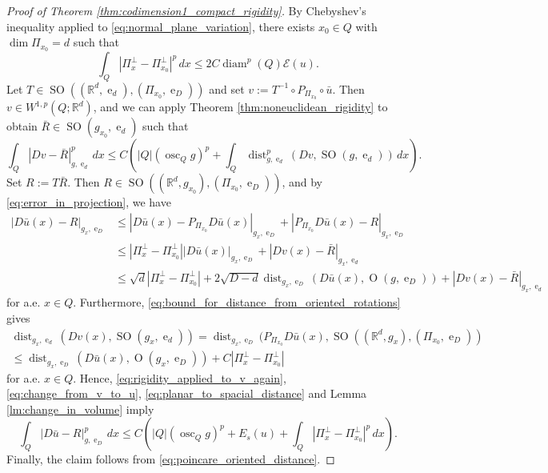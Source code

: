 \documentclass{article}
\numberwithin{equation}{section}
\theoremstyle{definition}
\theoremstyle{remark}
\DeclareMathOperator{\diam}{diam}
\DeclareMathOperator{\dist}{dist}
\DeclareMathOperator{\e}{e}
\DeclareMathOperator{\Ort}{O}
\DeclareMathOperator*{\osc}{osc}
\DeclareMathOperator{\SO}{SO}
\begin{document}
\begin{proof}[Proof of Theorem \ref{thm:codimension1_compact_rigidity}]
    By Chebyshev's inequality applied to \eqref{eq:normal_plane_variation}, there exists $x_0 \in Q$ with $\dim \Pi_{x_0} = d$ such that
    \begin{equation} \label{eq:poincare_oriented_distance}
        \int_Q |\Pi_x^\perp - \Pi_{x_0}^\perp|^p \, dx \le 2C \diam^p(Q) \mathcal{E}(u).
    \end{equation}
    Let $T \in \SO((\mathbb{R}^d, \e_d), (\Pi_{x_0}, \e_D))$ and set $v := T^{-1} \circ P_{\Pi_{x_0}} \circ \bar{u}$. Then $v \in W^{1, p}(Q; \mathbb{R}^d)$, and we can apply Theorem \ref{thm:noneuclidean_rigidity} to obtain $\bar{R} \in \SO(g_{x_0}, \e_d)$ such that
    \begin{equation} \label{eq:rigidity_applied_to_v_again}
        \int_Q |Dv - \bar{R}|_{g, \e_d}^p \, dx \le C \left(|Q| \left(\osc_Q g\right)^p + \int_Q \dist_{g, \e_d}^p(Dv, \SO(g, \e_d)) \, dx\right).
    \end{equation}
    Set $R := T\bar{R}$. Then $R \in \SO((\mathbb{R}^d, g_{x_0}), (\Pi_{x_0}, \e_D))$, and by \eqref{eq:error_in_projection}, we have
    \begin{equation} \label{eq:change_from_v_to_u}
        \begin{aligned}
            |D\bar{u}(x) - R|_{g_x, \e_D} &\le |D\bar{u}(x) - P_{\Pi_{x_0}} D\bar{u}(x)|_{g_x, \e_D} + |P_{\Pi_{x_0}} D\bar{u}(x) - R|_{g_x, \e_D} \\
            &\le |\Pi_x^\perp - \Pi_{x_0}^\perp| |D\bar{u}(x)|_{g_x, \e_D} + |Dv(x) - \bar{R}|_{g_x, \e_d} \\
            &\le \sqrt{d} |\Pi_x^\perp - \Pi_{x_0}^\perp| + 2\sqrt{D - d} \dist_{g_x, \e_D}(D\bar{u}(x), \Ort(g, \e_D)) + |Dv(x) - \bar{R}|_{g_x, \e_d}
        \end{aligned}
    \end{equation}
    for a.e. $x \in Q$. Furthermore, \eqref{eq:bound_for_distance_from_oriented_rotations} gives
    \begin{multline} \label{eq:planar_to_spacial_distance}
        \dist_{g_x, \e_d}(Dv(x), \SO(g_x, \e_d)) = \dist_{g_x, \e_D}(P_{\Pi_{x_0}} D\bar{u}(x), \SO((\mathbb{R}^d, g_x), (\Pi_{x_0}, \e_D)) \\
        \le \dist_{g_x, \e_D}(D\bar{u}(x), \Ort(g_x, \e_D)) + C|\Pi_x^\perp - \Pi_{x_0}^\perp|
    \end{multline}
    for a.e. $x \in Q$. Hence, \eqref{eq:rigidity_applied_to_v_again}, \eqref{eq:change_from_v_to_u}, \eqref{eq:planar_to_spacial_distance} and Lemma \ref{lm:change_in_volume} imply
    \[
    \int_Q |D\bar{u} - R|_{g, \e_D}^p \, dx \le C \left(|Q| \left(\osc_Q g\right)^p + E_s(u) + \int_Q |\Pi_x^\perp - \Pi_{x_0}^\perp|^p \, dx\right).
    \]
    Finally, the claim follows from \eqref{eq:poincare_oriented_distance}.
\end{proof}
\end{document}
